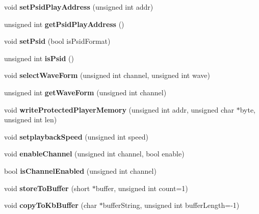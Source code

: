 \begin{DoxyCompactItemize}
void {\bfseries set\+Psid\+Play\+Address} (unsigned int addr)
\item 
\mbox{\label{class_t_e_d_abf4a153c0fe28c8cb1a05b09df7eb497}} 
unsigned int {\bfseries get\+Psid\+Play\+Address} ()
\item 
\mbox{\label{class_t_e_d_a013bed2d506539263c584bbacd909115}} 
void {\bfseries set\+Psid} (bool is\+Psid\+Format)
\item 
\mbox{\label{class_t_e_d_aa8e03e2fea3a835214a40ddca87a6d57}} 
unsigned int {\bfseries is\+Psid} ()
\item 
\mbox{\label{class_t_e_d_a44800d2bf26bff7492f609d231a61c47}} 
void {\bfseries select\+Wave\+Form} (unsigned int channel, unsigned int wave)
\item 
\mbox{\label{class_t_e_d_a576dd1ed791e35ba9adddfa3deb399e9}} 
unsigned int {\bfseries get\+Wave\+Form} (unsigned int channel)
\item 
\mbox{\label{class_t_e_d_aeb8b70e00675627c24dd5b54b4604d37}} 
void {\bfseries write\+Protected\+Player\+Memory} (unsigned int addr, unsigned char $\ast$byte, unsigned int len)
\item 
\mbox{\label{class_t_e_d_a494d1f807156122a0e9e3522d846a497}} 
void {\bfseries setplayback\+Speed} (unsigned int speed)
\item 
\mbox{\label{class_t_e_d_a76620cc9fe3f0efff72d5045c0b5805f}} 
void {\bfseries enable\+Channel} (unsigned int channel, bool enable)
\item 
\mbox{\label{class_t_e_d_acadb9e08e7f20a346fb788762da2407f}} 
bool {\bfseries is\+Channel\+Enabled} (unsigned int channel)
\item 
\mbox{\label{class_t_e_d_a25cc445fd7cbb8e3d5985af84dae107e}} 
void {\bfseries store\+To\+Buffer} (short $\ast$buffer, unsigned int count=1)
\item 
\mbox{\label{class_t_e_d_ab0f52bef5b93b4b15342cc8d4e5f44b0}} 
void {\bfseries copy\+To\+Kb\+Buffer} (char $\ast$buffer\+String, unsigned int buffer\+Length=-\/1)

\end{DoxyCompactItemize}
